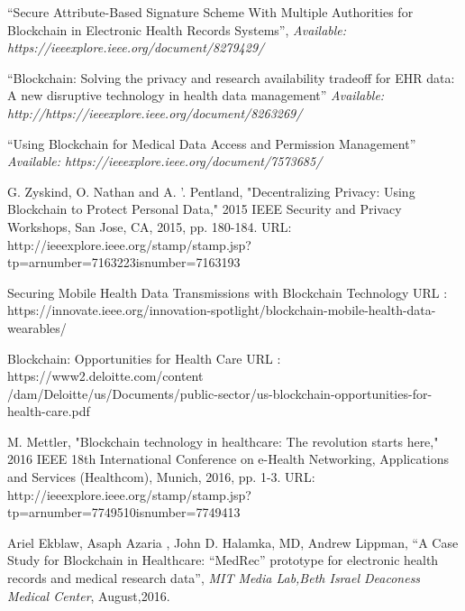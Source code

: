 \documentclass[11pt]{report}
\begin{document}
\begin{thebibliography}{999}



 \textquotedblleft  Secure Attribute-Based Signature Scheme With Multiple Authorities for Blockchain in Electronic Health Records Systems\textquotedblright, \textit 
{Available: https://ieeexplore.ieee.org/document/8279429/}


 \textquotedblleft Blockchain: Solving the privacy and research availability tradeoff for EHR data: A new disruptive technology in health data management\textquotedblright 
\textit{Available: http://https://ieeexplore.ieee.org/document/8263269/}

 \textquotedblleft Using Blockchain for Medical Data Access and Permission Management\textquotedblright 
\textit{Available: https://ieeexplore.ieee.org/document/7573685/}


G. Zyskind, O. Nathan and A. '. Pentland, "Decentralizing Privacy: Using Blockchain to Protect Personal Data," 2015 IEEE Security and Privacy Workshops, San Jose, CA, 2015, pp. 180-184.
URL: http://ieeexplore.ieee.org/stamp/stamp.jsp?tp=arnumber=7163223isnumber=7163193

Securing Mobile Health Data Transmissions with Blockchain Technology
URL : https://innovate.ieee.org/innovation-spotlight/blockchain-mobile-health-data-wearables/

Blockchain: 
Opportunities for Health Care 
URL : https://www2.deloitte.com/content\\/dam/Deloitte/us/Documents/public-sector/us-blockchain-opportunities-for-health-care.pdf

M. Mettler, "Blockchain technology in healthcare: The revolution starts here," 2016 IEEE 18th International Conference on e-Health Networking, Applications and Services (Healthcom), Munich, 2016, pp. 1-3.
URL: http://ieeexplore.ieee.org/stamp/stamp.jsp?tp=arnumber=7749510isnumber=7749413

 Ariel Ekblaw, Asaph Azaria , John D. Halamka, MD, Andrew Lippman, \textquotedblleft A Case Study for Blockchain in Healthcare:
“MedRec” prototype for electronic health records and medical research data\textquotedblright, \textit{MIT Media Lab,Beth Israel Deaconess Medical Center}, August,2016.

\end{thebibliography}
 
\end{document}
